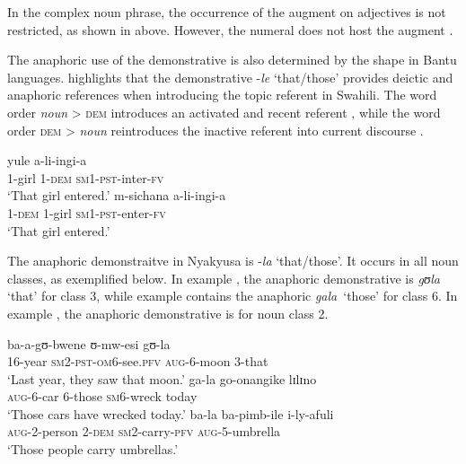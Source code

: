 \documentclass[output=paper]{langscibook}
\begin{document}
In the complex noun phrase, the occurrence of the augment on adjectives is not restricted, as shown in  above. However, the numeral does not host the augment . 

The anaphoric use of the demonstrative is also determined by the shape in Bantu languages. \citet[60]{Mwamzandi2014} highlights that the demonstrative -\textit{le} ‘that\slash those’ provides deictic and anaphoric references when introducing the topic referent in Swahili. The word order \textit{noun} > \textsc{dem} introduces an activated and recent referent , while the word order \textsc{dem} > \textit{noun} reintroduces the inactive referent into current discourse . 

\ea%
    \label{ex:lusekelo:39}
  {yule}  {a-li-ingi-a} \\
  1-girl     1-\textsc{dem}  \textsc{sm}1-\textsc{pst}-inter-\textsc{fv}  \\
\glt  ‘That girl entered.’
\ex%
    \label{ex:lusekelo:40}
   {m-sichana}  {a-li-ingi-a}   \\
  1-\textsc{dem}  1-girl    \textsc{sm}1-\textsc{pst}-enter-\textsc{fv}  \\
\glt  ‘That girl entered.’
\z

The anaphoric demonstraitve in Nyakyusa is -\textit{la} ‘that/those’. It occurs in all noun classes, as exemplified below. In example , the anaphoric demonstrative is \textit{gʊla} ‘that’ for class 3, while example  contains the anaphoric \textit{gala}~‘those’ for class 6. In example , the anaphoric demonstrative is for noun class 2. 

\ea\label{ex:lusekelo:41}
  {ba-a-gʊ{}-bwene}    {ʊ-mw-esi} {gʊ-la}\\
  16-year  \textsc{sm}2-\textsc{pst}-\textsc{om}6-see.\textsc{pfv}  \textsc{aug}-6-moon  3-that\\
\glt  ‘Last year, they saw that moon.’
\ex%
    \label{ex:lusekelo:42}
    {ga-la}   {go{}-onangike} lɪlɪno\\ 
  \textsc{aug}-6-car  6-those  \textsc{sm}6-wreck  today    \\
\glt  ‘Those cars have wrecked today.’
\ex%
    \label{ex:lusekelo:43}
    {ba-la}  {ba-pimb-ile}   {i-ly-afuli}\\
  \textsc{aug}-2-person   2-{\textsc{dem}}   \textsc{sm2-}carry-\textsc{{pfv}}   \textsc{aug-5-}umbrella\\
\glt  ‘Those people carry umbrellas.’ 
\z
\end{document}
